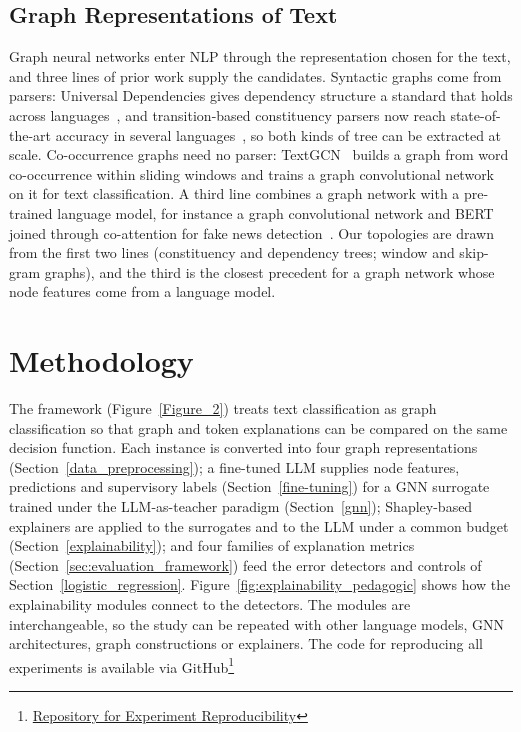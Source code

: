 \documentclass[preprint, times, review, 10pt]{elsarticle}
\begin{document}
\subsection{Graph Representations of Text} \label{text_trees}

Graph neural networks enter NLP through the representation chosen for the text, and three lines of prior work supply the candidates. Syntactic graphs come from parsers: Universal Dependencies gives dependency structure a standard that holds across languages~\cite{de-marneffe-etal-2021-universal}, and transition-based constituency parsers now reach state-of-the-art accuracy in several languages~\cite{bauer-manning-2025-high}, so both kinds of tree can be extracted at scale. Co-occurrence graphs need no parser: TextGCN~\cite{yao2019textgcn} builds a graph from word co-occurrence within sliding windows and trains a graph convolutional network on it for text classification. A third line combines a graph network with a pre-trained language model, for instance a graph convolutional network and BERT joined through co-attention for fake news detection~\cite{zhang2024gbca}. Our topologies are drawn from the first two lines (constituency and dependency trees; window and skip-gram graphs), and the third is the closest precedent for a graph network whose node features come from a language model.


\section{Methodology} \label{methodology}

The framework (Figure~\ref{Figure_2}) treats text classification as graph classification so that graph and token explanations can be compared on the same decision function. Each instance is converted into four graph representations (Section~\ref{data_preprocessing}); a fine-tuned LLM supplies node features, predictions and supervisory labels (Section~\ref{fine-tuning}) for a GNN surrogate trained under the LLM-as-teacher paradigm (Section~\ref{gnn}); Shapley-based explainers are applied to the surrogates and to the LLM under a common budget (Section~\ref{explainability}); and four families of explanation metrics (Section~\ref{sec:evaluation_framework}) feed the error detectors and controls of Section~\ref{logistic_regression}. Figure~\ref{fig:explainability_pedagogic} shows how the explainability modules connect to the detectors. The modules are interchangeable, so the study can be repeated with other language models, GNN architectures, graph constructions or explainers. The code for reproducing all experiments is available via GitHub\footnote{\href{https://anonymous.4open.science/r/Graph-Neural-Networks-Enable-Superior-Error-Detection-in-NLP-Explainability-than-Language-Models-A792/README.md}{Repository for Experiment Reproducibility}}
\end{document}
